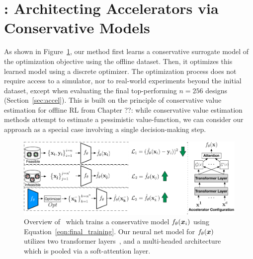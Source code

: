 \section{\primemethodname: Architecting Accelerators via Conservative Models}
\label{sec:method}
%
As shown in Figure~\ref{fig:method}, our method first learns a conservative surrogate model of the optimization objective using the offline dataset. Then, it optimizes this learned model using a discrete optimizer. The optimization process does not require access to a simulator, nor to real-world experiments beyond the initial dataset, except when evaluating the final top-performing $n=256$ designs (Section~\ref{sec:accel}). This is built on the principle of conservative value estimation for offline RL from Chapter ??: while conservative value estimation methods attempt to estimate a pessimistic value-function, we can consider our approach as a special case involving a single decision-making step.

\begin{figure}
    \centering
    \vspace{-0.3cm}
    \includegraphics[width=0.7\linewidth]{chapters/prime/figs/overview/mbo-method.pdf}
    \vspace{-0.1cm}
    \caption{\small{Overview of \primemethodname\ which trains a conservative model ${f}_\theta({\boldsymbol{x}}_i)$ using Equation~\ref{eqn:final_training}. Our neural net model for ${f}_\theta({\boldsymbol{x}})$ utilizes two transformer layers~\citep{vaswani2017attention}, and a multi-headed architecture which is pooled via a soft-attention layer.}}
    \vspace{-0.3cm}
    \label{fig:method}
\end{figure}

